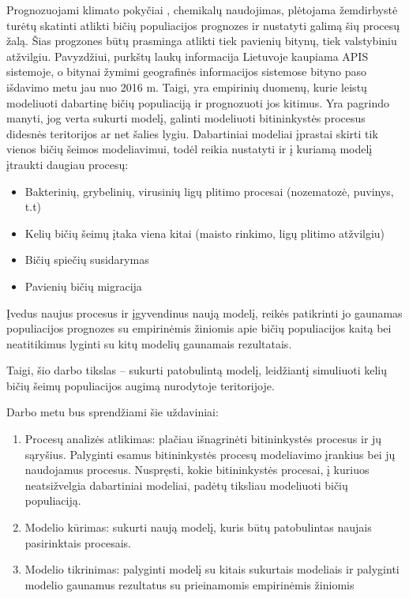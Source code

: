 \documentclass{VUMIFPSmagistrinis}
\begin{document}
 Prognozuojami klimato pokyčiai \cite{IPC18}, chemikalų naudojimas, plėtojama žemdirbystė turėtų skatinti atlikti bičių populiacijos prognozes ir nustatyti galimą šių procesų žalą. Šias progzones būtų prasminga atlikti tiek pavienių bitynų, tiek valstybiniu atžvilgiu. Pavyzdžiui, purkštų laukų informacija Lietuvoje kaupiama APIS sistemoje, o bitynai žymimi geografinės informacijos sistemose bityno paso išdavimo metu jau nuo 2016 m. Taigi, yra empirinių duomenų, kurie leistų modeliuoti dabartinę bičių populiaciją ir prognozuoti jos kitimus. Yra pagrindo manyti, jog verta sukurti modelį, galinti modeliuoti bitininkystės procesus didesnės teritorijos ar net šalies lygiu. Dabartiniai modeliai įprastai skirti tik vienos bičių šeimos modeliavimui, todėl reikia nustatyti ir į kuriamą modelį įtraukti daugiau procesų: 
\begin{itemize}
\item Bakterinių, grybelinių, virusinių ligų plitimo procesai (nozematozė, puvinys, t.t)
\item Kelių bičių šeimų įtaka viena kitai (maisto rinkimo, ligų plitimo atžvilgiu)
\item Bičių spiečių susidarymas
\item Pavienių bičių migracija
\end{itemize}

Įvedus naujus procesus ir įgyvendinus naują modelį, reikės patikrinti jo gaunamas populiacijos prognozes su empirinėmis žiniomis apie bičių populiacijos kaitą bei neatitikimus lyginti su kitų modelių gaunamais rezultatais.



Taigi, šio darbo tikslas -- sukurti patobulintą modelį, leidžiantį simuliuoti kelių bičių šeimų populiacijos augimą nurodytoje teritorijoje.

Darbo metu bus sprendžiami šie uždaviniai:
\begin{enumerate}
    \item Procesų analizės atlikimas: plačiau išnagrinėti bitininkystės procesus ir jų sąryšius. Palyginti esamus bitininkystės procesų modeliavimo įrankius bei jų naudojamus procesus. Nuspręsti, kokie bitininkystės procesai, į kuriuos neatsižvelgia dabartiniai modeliai, padėtų tiksliau modeliuoti bičių populiaciją.
    \item  Modelio kūrimas: sukurti naują modelį, kuris būtų patobulintas naujais pasirinktais procesais.
    \item Modelio tikrinimas: palyginti modelį su kitais sukurtais modeliais ir palyginti modelio gaunamus rezultatus su prieinamomis empirinėmis žiniomis
\end{enumerate}
\end{document}
